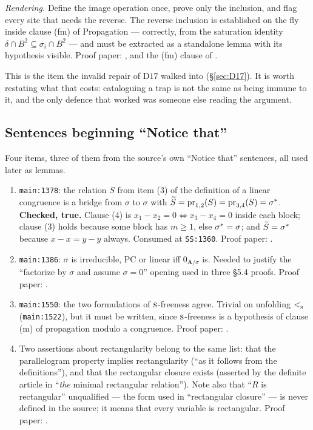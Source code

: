 \emph{Rendering.} Define the image operation once, prove only the inclusion,
and flag every site that needs the reverse. The reverse inclusion is
established on the fly inside clause (fm) of Propagation --- correctly, from
the saturation identity $\delta\cap B^{2}\subseteq\sigma_{i}\cap B^{2}$ --- and
must be extracted as a standalone lemma with its hypothesis visible. Proof
paper: , and the (fm) clause of
.

This is the item the invalid repair of $\mathrm D17$ walked into
(\S\ref{sec:D17}). It is worth restating what that costs: cataloguing a trap is
not the same as being immune to it, and the only defence that worked was
someone else reading the argument.

\subsection{Sentences beginning ``Notice that''}\label{sec:leg-notice}

Four items, three of them from the source's own ``Notice that'' sentences, all
used later as lemmas.

\begin{enumerate}\alphlabels\tightlist
\item \texttt{main:1378}: the relation $S$ from item (3) of the definition of a
  linear congruence is a bridge from $\sigma$ to $\sigma$ with
  $\widetilde{S}=\operatorname*{pr}_{1,2}(S)=\operatorname*{pr}_{3,4}(S)=\sigma^{*}$. \textbf{Checked,
  true.} Clause (4) is $x_{1}-x_{2}=0\iff x_{3}-x_{4}=0$ inside each block;
  clause (3) holds because some block has $m\ge1$, else $\sigma^{*}=\sigma$;
  and $\widetilde{S}=\sigma^{*}$ because $x-x=y-y$ always. Consumed at
  \texttt{SS:1360}. Proof paper: .
\item \texttt{main:1386}: $\sigma$ is irreducible, PC or linear iff
  $0_{\mathbf A/\sigma}$ is. Needed to justify the ``factorize by $\sigma$ and
  assume $\sigma=0$'' opening used in three \S5.4 proofs. Proof paper:
  .
\item \texttt{main:1550}: the two formulations of $\textup{\textsc{s}}$-freeness agree.
  Trivial on unfolding $<_{\textup{\textsc{s}}}^{}$ (\texttt{main:1522}), but it must be
  written, since $\textup{\textsc{s}}$-freeness is a hypothesis of clause (m) of propagation
  modulo a congruence. Proof paper: .
\item Two assertions about rectangularity belong to the same list: that the
  parallelogram property implies rectangularity (``as it follows from the
  definitions''), and that the rectangular closure exists (asserted by the
  definite article in ``\emph{the} minimal rectangular relation''). Note also
  that ``$R$ is rectangular'' unqualified --- the form used in ``rectangular
  closure'' --- is never defined in the source; it means that every variable is
  rectangular. Proof paper: .
\end{enumerate}

